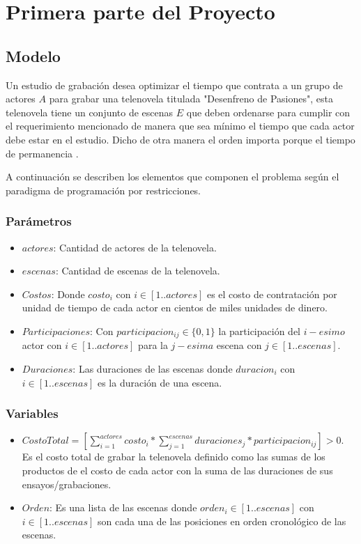 \documentclass{article}
\begin{document}

\section{Primera parte del Proyecto}
\subsection{Modelo}
Un estudio de grabación desea optimizar el tiempo que contrata a un grupo de actores $A$ para grabar una telenovela titulada "Desenfreno de Pasiones", esta telenovela tiene un conjunto de escenas $E$ que deben ordenarse para cumplir con el requerimiento mencionado de manera que sea mínimo el tiempo que cada actor debe estar en el estudio. Dicho de otra manera el orden importa porque el tiempo de permanencia . \newline

A continuación se describen los elementos que componen el problema según el paradigma de programación por restricciones.

\subsubsection{Parámetros}
\begin{itemize}
    \item $actores$: Cantidad de actores de la telenovela.
    \item $escenas$: Cantidad de escenas de la telenovela.
    \item $Costos$: Donde $costo_i$ con $i \in [1..actores]$ es el costo de contratación por unidad de tiempo de cada actor en cientos de miles unidades de dinero.
    \item $Participaciones$: Con $participacion_{ij} \in \{0,1\}$ la participación del $i-esimo$ actor con $i \in [1..actores]$ para la $j-esima$ escena con $j \in [1..escenas]$.
    \item $Duraciones$: Las duraciones de las escenas donde $duracion_i$ con $i \in [1..escenas]$ es la duración de una escena.
\end{itemize}

\subsubsection{Variables}
\begin{itemize}
    \item $CostoTotal = [\sum_{i=1}^{actores} costo_i * \sum_{j=1}^{escenas}duraciones_j * participacion_{ij} ]   > 0$. \newline\newline  
    Es el costo total de grabar la telenovela definido como las sumas de los productos de el costo de cada actor con la suma de las duraciones de sus ensayos/grabaciones.
    \item $Orden$: Es una lista de las escenas donde $orden_i \in [1..escenas]$ con $i \in [1..escenas]$ son cada una de las posiciones en orden cronológico de las escenas.
\end{itemize}
\end{document}
